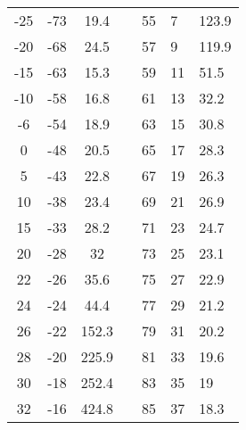 \begin{table}[!htb]
\begin{tabular}{cccl|l|l|l|}
\multicolumn{1}{|c|}{-25} & \multicolumn{1}{c|}{-73} & \multicolumn{1}{c|}{19.4} &  & 55 & 7 & 123.9 \\ \cline{1-3} \cline{5-7} 
\multicolumn{1}{|c|}{-20} & \multicolumn{1}{c|}{-68} & \multicolumn{1}{c|}{24.5} &  & 57 & 9 & 119.9 \\ \cline{1-3} \cline{5-7} 
\multicolumn{1}{|c|}{-15} & \multicolumn{1}{c|}{-63} & \multicolumn{1}{c|}{15.3} &  & 59 & 11 & 51.5 \\ \cline{1-3} \cline{5-7} 
\multicolumn{1}{|c|}{-10} & \multicolumn{1}{c|}{-58} & \multicolumn{1}{c|}{16.8} &  & 61 & 13 & 32.2 \\ \cline{1-3} \cline{5-7} 
\multicolumn{1}{|c|}{-6} & \multicolumn{1}{c|}{-54} & \multicolumn{1}{c|}{18.9} &  & 63 & 15 & 30.8 \\ \cline{1-3} \cline{5-7} 
\multicolumn{1}{|c|}{0} & \multicolumn{1}{c|}{-48} & \multicolumn{1}{c|}{20.5} &  & 65 & 17 & 28.3 \\ \cline{1-3} \cline{5-7} 
\multicolumn{1}{|c|}{5} & \multicolumn{1}{c|}{-43} & \multicolumn{1}{c|}{22.8} &  & 67 & 19 & 26.3 \\ \cline{1-3} \cline{5-7} 
\multicolumn{1}{|c|}{10} & \multicolumn{1}{c|}{-38} & \multicolumn{1}{c|}{23.4} &  & 69 & 21 & 26.9 \\ \cline{1-3} \cline{5-7} 
\multicolumn{1}{|c|}{15} & \multicolumn{1}{c|}{-33} & \multicolumn{1}{c|}{28.2} &  & 71 & 23 & 24.7 \\ \cline{1-3} \cline{5-7} 
\multicolumn{1}{|c|}{20} & \multicolumn{1}{c|}{-28} & \multicolumn{1}{c|}{32} &  & 73 & 25 & 23.1 \\ \cline{1-3} \cline{5-7} 
\multicolumn{1}{|c|}{22} & \multicolumn{1}{c|}{-26} & \multicolumn{1}{c|}{35.6} &  & 75 & 27 & 22.9 \\ \cline{1-3} \cline{5-7} 
\multicolumn{1}{|c|}{24} & \multicolumn{1}{c|}{-24} & \multicolumn{1}{c|}{44.4} &  & 77 & 29 & 21.2 \\ \cline{1-3} \cline{5-7} 
\multicolumn{1}{|c|}{26} & \multicolumn{1}{c|}{-22} & \multicolumn{1}{c|}{152.3} &  & 79 & 31 & 20.2 \\ \cline{1-3} \cline{5-7} 
\multicolumn{1}{|c|}{28} & \multicolumn{1}{c|}{-20} & \multicolumn{1}{c|}{225.9} &  & 81 & 33 & 19.6 \\ \cline{1-3} \cline{5-7} 
\multicolumn{1}{|c|}{30} & \multicolumn{1}{c|}{-18} & \multicolumn{1}{c|}{252.4} &  & 83 & 35 & 19 \\ \cline{1-3} \cline{5-7} 
\multicolumn{1}{|c|}{32} & \multicolumn{1}{c|}{-16} & \multicolumn{1}{c|}{424.8} &  & 85 & 37 & 18.3 \\ \cline{1-3} \cline{5-7} 

\end{tabular}
\end{table}
